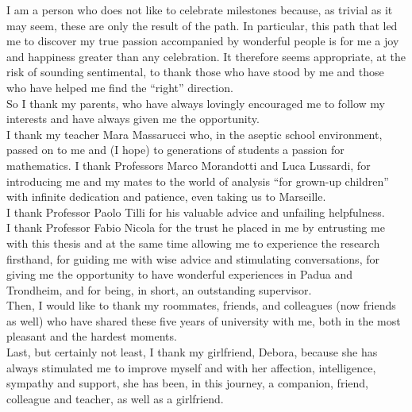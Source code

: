 \documentclass[corpo=11pt, stile=classica, tipotesi=custom,
greek, evenboxes, english]{toptesi} %
\numberwithin{equation}{chapter}
\theoremstyle{definition}
\theoremstyle{remark}
\begin{document}
\english

\ringraziamenti
I am a person who does not like to celebrate milestones because, as trivial as it may seem, these are only the result of the path. In particular, this path that led me to discover my true passion accompanied by wonderful people is for me a joy and happiness greater than any celebration.
It therefore seems appropriate, at the risk of sounding sentimental, to thank those who have stood by me and those who have helped me find the ``right'' direction.\\
So I thank my parents, who have always lovingly encouraged me to follow my interests and have always given me the opportunity.\\
I thank my teacher Mara Massarucci who, in the aseptic school environment, passed on to me and (I hope) to generations of students a passion for mathematics.
I thank Professors Marco Morandotti and Luca Lussardi, for introducing me and my mates to the world of analysis ``for grown-up children'' with infinite dedication and patience, even taking us to Marseille.\\
I thank Professor Paolo Tilli for his valuable advice and unfailing helpfulness.\\
I thank Professor Fabio Nicola for the trust he placed in me by entrusting me with this thesis and at the same time allowing me to experience the research firsthand, for guiding me with wise advice and stimulating conversations, for giving me the opportunity to have wonderful experiences in Padua and Trondheim, and for being, in short, an outstanding supervisor.\\
Then, I would like to thank my roommates, friends, and colleagues (now friends as well) who have shared these five years of university with me, both in the most pleasant and the hardest moments.\\
Last, but certainly not least, I thank my girlfriend, Debora, because she has always stimulated me to improve myself and with her affection, intelligence, sympathy and support, she has been, in this journey, a companion, friend, colleague and teacher, as well as a girlfriend.
\end{document}
